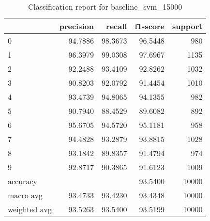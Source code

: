 \begin{table}[htb!]
\centering
\begin{tabular}{lrrrr}
\toprule
 & precision & recall & f1-score & support \\
\midrule
0 & 94.7886 & 98.3673 & 96.5448 & 980 \\
1 & 96.3979 & 99.0308 & 97.6967 & 1135 \\
2 & 92.2488 & 93.4109 & 92.8262 & 1032 \\
3 & 90.8203 & 92.0792 & 91.4454 & 1010 \\
4 & 93.4739 & 94.8065 & 94.1355 & 982 \\
5 & 90.7940 & 88.4529 & 89.6082 & 892 \\
6 & 95.6705 & 94.5720 & 95.1181 & 958 \\
7 & 94.4828 & 93.2879 & 93.8815 & 1028 \\
8 & 93.1842 & 89.8357 & 91.4794 & 974 \\
9 & 92.8717 & 90.3865 & 91.6123 & 1009 \\
accuracy & & & 93.5400 & 10000 \\
macro avg & 93.4733 & 93.4230 & 93.4348 & 10000 \\
weighted avg & 93.5263 & 93.5400 & 93.5199 & 10000 \\
\bottomrule
\end{tabular}
\caption{Classification report for baseline\_svm\_15000}
\label{tab:classification-report-baseline_svm_15000}
\end{table}
